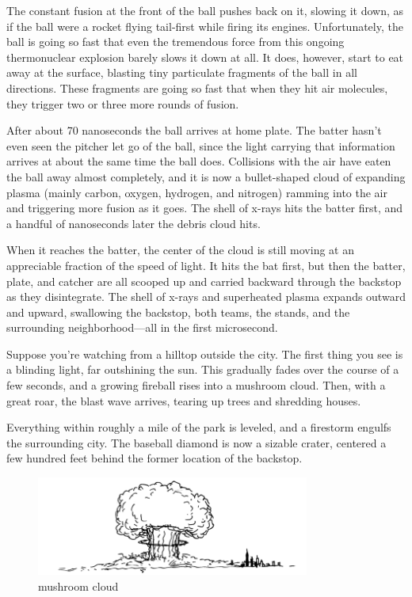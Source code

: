 {The constant fusion at the front of the ball pushes back on it, slowing it down, as if the ball were a rocket flying tail-first while firing its engines. Unfortunately, the ball is going so fast that even the tremendous force from this ongoing thermonuclear explosion barely slows it down at all. It does, however, start to eat away at the surface, blasting tiny particulate fragments of the ball in all directions. These fragments are going so fast that when they hit air molecules, they trigger two or three more rounds of fusion.}

{After about 70 nanoseconds the ball arrives at home plate. The batter hasn't even seen the pitcher let go of the ball, since the light carrying that information arrives at about the same time the ball does. Collisions with the air have eaten the ball away almost completely, and it is now a bullet-shaped cloud of expanding plasma (mainly carbon, oxygen, hydrogen, and nitrogen) ramming into the air and triggering more fusion as it goes. The shell of x-rays hits the batter first, and a handful of nanoseconds later the debris cloud hits.}

{When it reaches the batter, the center of the cloud is still moving at an appreciable fraction of the speed of light. It hits the bat first, but then the batter, plate, and catcher are all scooped up and carried backward through the backstop as they disintegrate. The shell of x-rays and superheated plasma expands outward and upward, swallowing the backstop, both teams, the stands, and the surrounding neighborhood—all in the first microsecond.}

{Suppose you’re watching from a hilltop outside the city. The first thing you see is a blinding light, far outshining the sun. This gradually fades over the course of a few seconds, and a growing fireball rises into a mushroom cloud. Then, with a great roar, the blast wave arrives, tearing up trees and shredding houses.}

{Everything within roughly a mile of the park is leveled, and a firestorm engulfs the surrounding city. The baseball diamond is now a sizable crater, centered a few hundred feet behind the former location of the backstop.}

\begin{figure}[!htbp]
\centering
\includegraphics[scale=0.5, max width=0.8\textwidth]{imgs/a/1/05.png}
\caption{mushroom cloud}
\end{figure}

